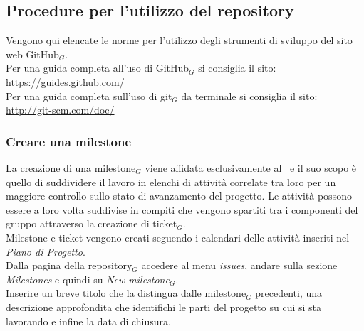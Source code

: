 \subsection{Procedure per l'utilizzo del repository} \label{procedureticket}
Vengono qui elencate le norme per l'utilizzo degli strumenti di sviluppo del sito web GitHub$_G$. \\
Per una guida completa all'uso di GitHub$_G$ si consiglia il sito: \\
\url{https://guides.github.com/}\\
Per una guida completa sull'uso di git$_G$ da terminale si consiglia il sito: \\
\url{http://git-scm.com/doc/}

\subsubsection{Creare una milestone}
La creazione di una milestone$_G$ viene affidata esclusivamente al \ruoloResponsabile\ e il suo scopo è quello di suddividere il lavoro in elenchi di attività correlate tra loro per un maggiore controllo sullo stato di avanzamento del progetto. Le attività possono essere a loro volta suddivise in compiti che vengono spartiti tra i componenti del gruppo attraverso la creazione di ticket$_G$. \\
Milestone e ticket vengono creati seguendo i calendari delle attività inseriti nel \textit{Piano di Progetto}. \\
    Dalla pagina della repository$_G$ accedere al menu \textit{issues}, andare sulla sezione \textit{Milestones} e quindi su \textit{New milestone$_G$}.\\
    Inserire un breve titolo che la distingua dalle milestone$_G$ precedenti, una descrizione approfondita che identifichi le parti del progetto su cui si sta lavorando e infine la data di chiusura.


